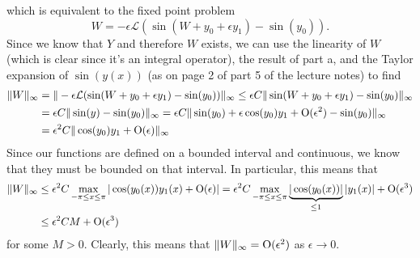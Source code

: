 \documentclass{article}
\begin{document}
which is equivalent to the fixed point problem
\[
W=-\epsilon\mathcal{L}(\sin(W+y_0+\epsilon y_1)-\sin(y_0)).
\]
Since we know that $Y$ and therefore $W$ exists, we can use the linearity of $W$ (which is clear since it's an integral operator), the result of part a, and the Taylor expansion of $\sin(y(x))$ (as on page 2 of part 5 of the lecture notes) to find
\begin{align*}
\|W\|_\infty&=\|-\epsilon\mathcal{L}(\sin(W+y_0+\epsilon y_1)-\sin(y_0))\|_\infty\leq \epsilon C \|\sin(W+y_0+\epsilon y_1)-\sin(y_0)\|_\infty\\&=
\epsilon C\|\sin(y)-\sin(y_0)\|_\infty=\epsilon C\|\sin(y_0)+\epsilon\cos(y_0)y_1+\operatorname{O}(\epsilon^2)-\sin(y_0)\|_\infty\\&=
\epsilon^2C\|\cos(y_0)y_1+\operatorname{O}(\epsilon)\|_\infty
\end{align*}
Since our functions are defined on a bounded interval and continuous, we know that they must be bounded on that interval. In particular, this means that 
\begin{align*}
\|W\|_\infty&\leq \epsilon^2C \max_{-\pi \leq x \leq \pi} |\cos(y_0(x))y_1(x)+\operatorname{O}(\epsilon)|=\epsilon^2C\max_{-\pi \leq x \leq \pi} \underbrace{|\cos(y_0(x))|}_{\leq1}|y_1(x)|+\operatorname{O}(\epsilon^3)\\&\leq
\epsilon^2C M+\operatorname{O}(\epsilon^3)
\end{align*}
for some $M>0$. Clearly, this means that $\|W\|_\infty=\operatorname{O}(\epsilon^2)$ as $\epsilon\to0$.
\end{document}
